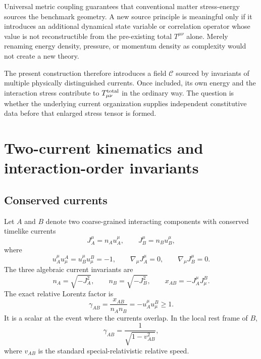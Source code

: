 \documentclass[11pt]{article}
\begin{document}
Universal metric coupling guarantees that conventional matter stress-energy sources the benchmark geometry.  A new source principle is meaningful only if it introduces an additional dynamical state variable or correlation operator whose value is not reconstructible from the pre-existing total $T^{\mu\nu}$ alone.  Merely renaming energy density, pressure, or momentum density as complexity would not create a new theory.

The present construction therefore introduces a field $\mathcal C$ sourced by invariants of multiple physically distinguished currents.  Once included, its own energy and the interaction stress contribute to $T_{\mu\nu}^{\rm total}$ in the ordinary way.  The question is whether the underlying current organization supplies independent constitutive data before that enlarged stress tensor is formed.

\section{Two-current kinematics and interaction-order invariants}

\subsection{Conserved currents}

Let $A$ and $B$ denote two coarse-grained interacting components with conserved timelike currents
\begin{equation}
J_A^\mu=n_Au_A^\mu,
\qquad
J_B^\mu=n_Bu_B^\mu,
\label{eq:currents}
\end{equation}
where
\begin{equation}
u_A^\mu u^A_\mu=u_B^\mu u^B_\mu=-1,
\qquad
\nabla_\mu J_A^\mu=0,
\qquad
\nabla_\mu J_B^\mu=0.
\label{eq:currentconservation}
\end{equation}
The three algebraic current invariants are
\begin{equation}
n_A=\sqrt{-J_A^2},
\qquad
n_B=\sqrt{-J_B^2},
\qquad
x_{AB}=-J_A^\mu J^B_\mu.
\label{eq:currentinvariants}
\end{equation}
The exact relative Lorentz factor is
\begin{equation}
\gamma_{AB}
=\frac{x_{AB}}{n_An_B}
=-u_A^\mu u^B_\mu
\geq1.
\label{eq:gammaAB}
\end{equation}
It is a scalar at the event where the currents overlap.  In the local rest frame of $B$,
\begin{equation}
\gamma_{AB}=\frac{1}{\sqrt{1-v_{AB}^2}},
\label{eq:gammaVelocity}
\end{equation}
where $v_{AB}$ is the standard special-relativistic relative speed.
\end{document}
